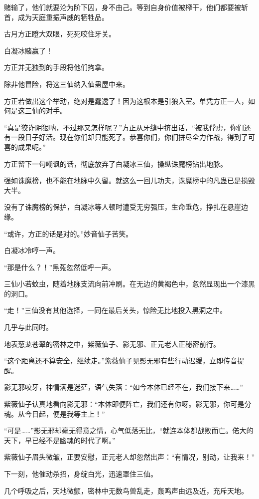 \begin{this_body}
赌输了，他们就要沦为阶下囚，身不由己。等到自身价值被榨干，他们都要被斩首，成为天庭重振声威的牺牲品。

古月方正瞪大双眼，死死咬住牙关。

白凝冰赌赢了！

方正并无独到的手段将他们拘拿。

除非他冒险，将这三仙纳入仙蛊屋中来。

方正若做出这个举动，绝对是蠢透了！因为这根本是引狼入室。单凭方正一人，如何是这三仙的对手。

“真是狡诈阴狠呐，不过那又怎样呢？”方正从牙缝中挤出话，“被我俘虏，你们还有一段日子好活。现在你们却只能死了。恭喜你们，你们拼尽全力作战，得到了可喜的成果呢。”

方正留下一句嘲讽的话，彻底放弃了白凝冰三仙，操纵诛魔榜钻出地脉。

强如诛魔榜，也不能在地脉中久留。就这么一回儿功夫，诛魔榜中的凡蛊已是损毁大半。

没有了诛魔榜的保护，白凝冰等人顿时遭受无穷强压，生命垂危，挣扎在悬崖边缘。

“或许，方正的话是对的。”妙音仙子苦笑。

白凝冰冷哼一声。

“那是什么？！”黑菟忽然低呼一声。

三仙小若蚊虫，随着地脉支流向前冲刷。在无边的黄褐色中，忽然显现出一个漆黑的洞口。

“走！”三仙没有其他选择，一同在最后关头，惊险无比地投入黑洞之中。

几乎与此同时。

地表葱茏苍翠的密林之中，紫薇仙子、影无邪、正元老人正秘密前行。

“这个距离还不算安全，继续走。”紫薇仙子见影无邪有些行动迟缓，立即传音提醒。

影无邪咬牙，神情满是迷茫，语气失落：“如今本体已经不在，我们接下来……”

紫薇仙子认真地看向影无邪：“本体即便阵亡，我们还有你呀。影无邪，你可是分魂。从今日起，便是我等主上！”

“可是……”影无邪却毫无得意之情，心气低落无比，“就连本体都战败而亡。偌大的天下，早已经不是幽魂的时代了啊。”

紫薇仙子眉头微皱，正要安慰，正元老人却忽然出声：“有情况，别动，让我来！”

下一刻，他催动杀招，身绽白光，迅速罩住三仙。

几个呼吸之后，天地微颤，密林中无数鸟兽乱走，轰鸣声由远及近，充斥天地。


\end{this_body}
